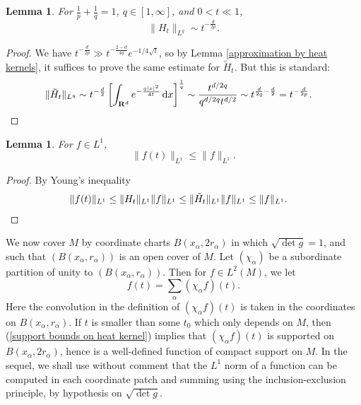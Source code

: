 \documentclass[reqno,11pt]{amsart}
\newcommand{\RR}{\mathbf{R}}
\newcommand*\dif{\mathop{}\!\mathrm{d}}
\newtheorem{lemma}[theorem]{Lemma}
\theoremstyle{definition}
\numberwithin{equation}{section}
\begin{document}
\begin{lemma}
For $\frac{1}{p} + \frac{1}{q} = 1$, $q \in [1, \infty]$, and $0 < t \ll 1$,
\begin{equation}\label{Lq norm of truncated heat kernel}
	\|H_t\|_{L^q} \sim t^{-\frac{d}{2p}}.
\end{equation}
\end{lemma}
\begin{proof}
We have $t^{-\frac{d}{2p}} \gg t^{-\frac{2 - d}{4q}} e^{-1/4 \sqrt t}$, so by Lemma \ref{approximation by heat kernels}, it suffices to prove the same estimate for $\tilde H_t$. But this is standard:
\begin{align*}
\|\tilde H_t\|_{L^q} &\sim t^{-\frac{d}{2}} \left[\int_{\RR^d} e^{-\frac{q|x|^2}{4t}} \dif x\right]^{\frac{1}{q}} \sim \frac{t^{d/2q}}{q^{d/2q}t^{d/2}} \sim t^{\frac{d}{2q} - \frac{d}{2}} = t^{-\frac{d}{2p}}. \qedhere
\end{align*}
\end{proof}

\begin{lemma}
For $f \in L^1$,
\begin{equation}\label{heat flow is contraction}
	\|f(t)\|_{L^1} \leq \|f\|_{L^1}.
\end{equation}
\end{lemma}
\begin{proof}
By Young's inequality
\begin{align*}
	\|f(t)\|_{L^1} &\leq \|H_t\|_{L^1} \|f\|_{L^1} \leq \|\tilde H_t\|_{L^1} \|f\|_{L^1} \leq \|f\|_{L^1}. \qedhere
\end{align*}
\end{proof}

We now cover $M$ by coordinate charts $B(x_\alpha, 2r_\alpha)$ in which $\sqrt{\det g} = 1$, and such that $(B(x_\alpha, r_\alpha))$ is an open cover of $M$.
Let $(\chi_\alpha)$ be a subordinate partition of unity to $(B(x_\alpha, r_\alpha))$.
Then for $f \in L^2(M)$, we let
$$f(t) = \sum_\alpha (\chi_\alpha f)(t).$$
Here the convolution in the definition of $(\chi_\alpha f)(t)$ is taken in the coordinates on $B(x_\alpha, r_\alpha)$.
If $t$ is smaller than some $t_0$ which only depends on $M$, then (\ref{support bounds on heat kernel}) implies that $(\chi_\alpha f)(t)$ is supported on $B(x_\alpha, 2r_\alpha)$, hence is a well-defined function of compact support on $M$.
In the sequel, we shall use without comment that the $L^1$ norm of a function can be computed in each coordinate patch and summing using the inclusion-exclusion principle, by hypothesis on $\sqrt{\det g}$.
\end{document}
